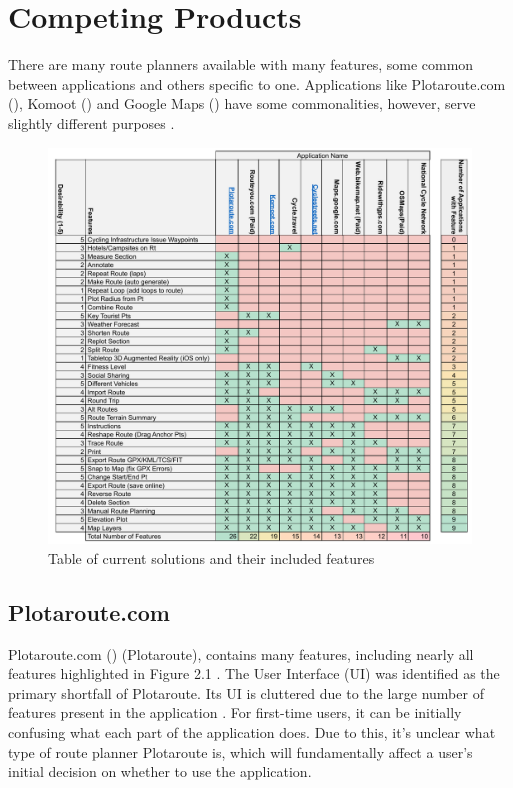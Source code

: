 \section{Competing Products}
\label{litrev:competingproducts}

There are many route planners available with many features, some common between applications and others specific to one. Applications like Plotaroute.com (\cite{noauthor_free_nodate}), Komoot (\cite{noauthor_komoot_nodate}) and Google Maps (\cite{noauthor_google_nodate}) have some commonalities, however, serve slightly different purposes .

\begin{figure}[h!]
    \centering
    \includegraphics[width=1\linewidth]{figures/current_apps.pdf}
    \caption{Table of current solutions and their included features}
    \label{fig:solutionsandfeatures}
\end{figure}

\subsection{Plotaroute.com}
\label{litrev:plotaroute}
Plotaroute.com (\cite{noauthor_free_nodate}) (Plotaroute), contains many features, including nearly all features highlighted in Figure 2.1 . The User Interface (UI) was identified as the primary shortfall of Plotaroute. Its UI is cluttered due to the large number of features present in the application . For first-time users, it can be initially confusing what each part of the application does. Due to this, it's unclear what type of route planner Plotaroute is, which will fundamentally affect a user's initial decision on whether to use the application.

